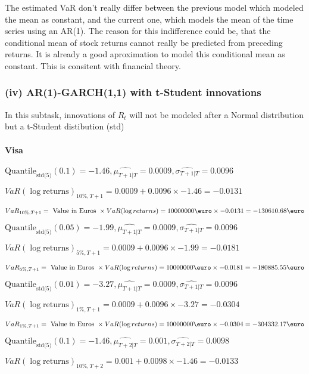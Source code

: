 The estimated VaR don't really differ between the previous model which modeled the mean as constant, and the current one, which models the mean of the time series using an AR(1). 
The reason for this indifference could be, that the conditional mean of stock returns cannot really be predicted from preceding returns. It is already a good aproximation to model this conditional mean as constant. This is consitent with financial theory.

\subsubsection{(iv) AR(1)-GARCH(1,1) with t-Student innovations}
In this subtask, innovations of $R_t$ will not be modeled after a Normal distribution but a t-Student distibution (std) 

\paragraph{Visa}


$\text{Quantile}_\text{std(5)}(0.1) = -1.46,\hat{\mu_{T+1|T}} = 0.0009, \hat{\sigma_{T+1|T}} = 0.0096$

$VaR(\log \text{returns})_{10\%, T + 1} = 0.0009 + 0.0096\times-1.46 = -0.0131$

$VaR_{10\%, T + 1} = \text{ Value in Euros } \times VaR(\log returns) = 10 000 000 \text{\euro} \times-0.0131 = -130610.68 \text{\euro}$


$\text{Quantile}_\text{std(5)}(0.05) = -1.99,\hat{\mu_{T+1|T}} = 0.0009, \hat{\sigma_{T+1|T}} = 0.0096$

$VaR(\log \text{returns})_{5\%, T + 1} = 0.0009 + 0.0096\times-1.99 = -0.0181$

$VaR_{5\%, T + 1} = \text{ Value in Euros } \times VaR(\log returns) = 10 000 000 \text{\euro} \times-0.0181 = -180885.55 \text{\euro}$


$\text{Quantile}_\text{std(5)}(0.01) = -3.27,\hat{\mu_{T+1|T}} = 0.0009, \hat{\sigma_{T+1|T}} = 0.0096$

$VaR(\log \text{returns})_{1\%, T + 1} = 0.0009 + 0.0096\times-3.27 = -0.0304$

$VaR_{1\%, T + 1} = \text{ Value in Euros } \times VaR(\log returns) = 10 000 000 \text{\euro} \times-0.0304 = -304332.17 \text{\euro}$


$\text{Quantile}_\text{std(5)}(0.1) = -1.46,\hat{\mu_{T+2|T}} = 0.001, \hat{\sigma_{T+2|T}} = 0.0098$

$VaR(\log \text{returns})_{10\%, T + 2} = 0.001 + 0.0098\times-1.46 = -0.0133$

